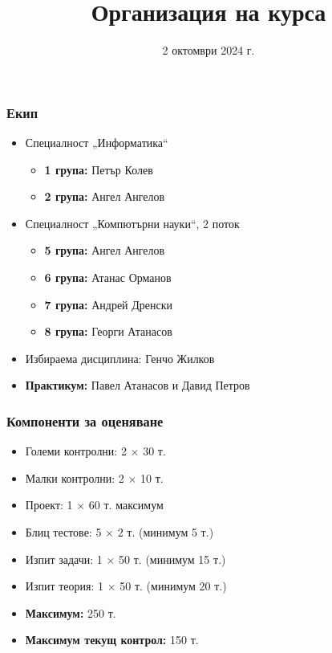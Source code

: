 \documentclass[alsotrans,beameroptions={aspectratio=169}]{beamerswitch}
\title{Организация на курса}
\date{2 октомври 2024 г.}
\begin{document}
\begin{frame}
  \titlepage
\end{frame}

\begin{frame}
  \frametitle{Екип}

  \begin{itemize}
  \item Специалност „Информатика“
    \begin{itemize}
    \item \textbf{1 група:} Петър Колев
    \item \textbf{2 група:} Ангел Ангелов
    \end{itemize}
  \item Специалност „Компютърни науки“, 2 поток
    \begin{itemize}
    \item \textbf{5 група:} Ангел Ангелов
    \item \textbf{6 група:} Атанас Орманов
    \item \textbf{7 група:} Андрей Дренски
    \item \textbf{8 група:} Георги Атанасов
    \end{itemize}
  \item Избираема дисциплина: Генчо Жилков
  \item \textbf{Практикум:} Павел Атанасов и Давид Петров
\end{itemize}
\end{frame}

\begin{frame}
  \frametitle{Компоненти за оценяване}

  \begin{itemize}
  \item Големи контролни: 2 $\times$ 30 т.
  \item Малки контролни: 2 $\times$ 10 т.
  \item Проект: 1 $\times$ 60 т. максимум
  \item Блиц тестове: 5 $\times$ 2 т. \alert{(минимум 5 т.)}
  \item Изпит задачи: 1 $\times$ 50 т. \alert{(минимум 15 т.)}
  \item Изпит теория: 1 $\times$ 50 т. \alert{(минимум 20 т.)}
  \item \textbf{Максимум:} 250 т.
  \item \textbf{Максимум текущ контрол:} 150 т.
  \end{itemize}
\end{frame}
\end{document}
